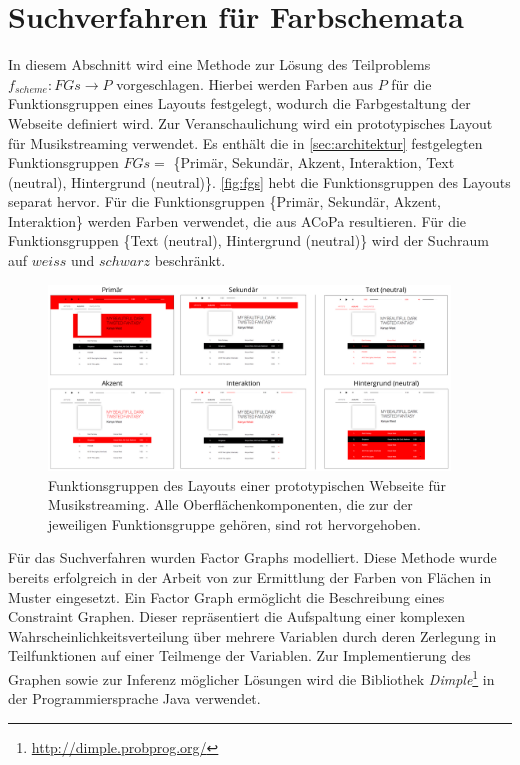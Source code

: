 \section{Suchverfahren für Farbschemata}
\label{sec:farbschema}

In diesem Abschnitt wird eine Methode zur Lösung des Teilproblems $f_{scheme}: FGs \to P$ vorgeschlagen. Hierbei werden Farben aus $P$ für die Funktionsgruppen eines Layouts festgelegt, wodurch die Farbgestaltung der Webseite definiert wird. Zur Veranschaulichung wird ein prototypisches Layout für Musikstreaming verwendet. Es enthält die in \autoref{sec:architektur} festgelegten Funktionsgruppen $FGs = $ \{Primär, Sekundär, Akzent, Interaktion, Text (neutral), Hintergrund (neutral)\}. \autoref{fig:fgs} hebt die Funktionsgruppen des Layouts separat hervor. Für die Funktionsgruppen \{Primär, Sekundär, Akzent, Interaktion\} werden Farben verwendet, die aus ACoPa resultieren. Für die Funktionsgruppen \{Text (neutral), Hintergrund (neutral)\} wird der Suchraum auf $weiss$ und $schwarz$ beschränkt.

\begin{figure}[h]
\centering
\includegraphics[width=0.95\textwidth]{img/fgs.png}
\caption{Funktionsgruppen des Layouts einer prototypischen Webseite für Musikstreaming. Alle Oberflächenkomponenten, die zur der jeweiligen Funktionsgruppe gehören, sind rot hervorgehoben.}
\label{fig:fgs}
\end{figure}

Für das Suchverfahren wurden Factor Graphs modelliert. Diese Methode wurde bereits erfolgreich in der Arbeit von \citet{magazines} zur Ermittlung der Farben von Flächen in Muster eingesetzt. Ein Factor Graph ermöglicht die Beschreibung eines Constraint Graphen. Dieser repräsentiert die Aufspaltung einer komplexen Wahrscheinlichkeitsverteilung über mehrere Variablen durch deren Zerlegung in Teilfunktionen auf einer Teilmenge der Variablen. Zur Implementierung des Graphen sowie zur Inferenz möglicher Lösungen wird die Bibliothek \emph{Dimple}\footnote{\url{http://dimple.probprog.org/}} in der Programmiersprache Java verwendet.

